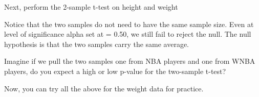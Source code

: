 \documentclass[
]{article}
\newenvironment{Shaded}{\begin{snugshade}}{\end{snugshade}}
\newcommand{\FunctionTok}[1]{\textcolor[rgb]{0.00,0.00,0.00}{#1}}
\newcommand{\NormalTok}[1]{#1}
\newcommand{\OtherTok}[1]{\textcolor[rgb]{0.56,0.35,0.01}{#1}}
\newcommand{\SpecialCharTok}[1]{\textcolor[rgb]{0.00,0.00,0.00}{#1}}
\begin{document}
Next, perform the 2-sample t-test on height and weight

\begin{Shaded}
\end{Shaded}

Notice that the two samples do not need to have the same sample size.
Even at level of significance alpha set at = 0.50, we still fail to
reject the null. The null hypothesis is that the two samples carry the
same average.

Imagine if we pull the two samples one from NBA players and one from
WNBA players, do you expect a high or low p-value for the two-sample
t-test?

Now, you can try all the above for the weight data for practice.
\end{document}
